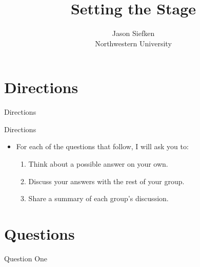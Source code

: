 \documentclass[10pt]{beamer}
\title{Setting the Stage}
\subtitle{}
\author{{\large Jason Siefken}\\
Northwestern University}
\date{}
\begin{document}
{
	\begin{frame}
	\titlepage
	\end{frame}
}

\section{Directions}


\begin{frame}{Directions}

\vspace{3em}

\begin{block}{Directions}
\vspace{-.5em}
\begin{itemize}
\item For each of the questions that follow, I will ask you to:
\begin{enumerate}
\item \alert{Think} about a possible answer on your own.
\item \alert{Discuss} your answers with the rest of your group.
\item \alert{Share} a summary of each group's discussion.
\end{enumerate}
\end{itemize}
\end{block}

\end{frame}


\section{Questions}


\begin{frame}{Question One}
\ 

\vfill


\vfill

\end{frame}
\end{document}
